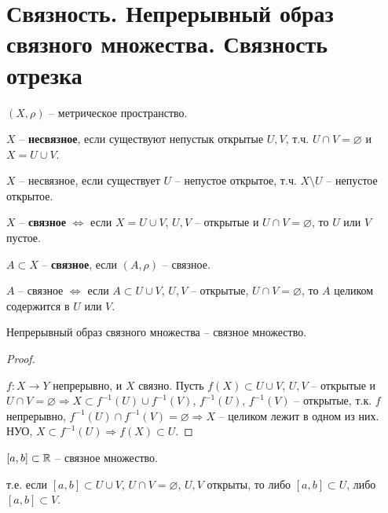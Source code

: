 
\section{Связность. Непрерывный образ связного множества. Связность отрезка}


\begin{conj}
    $(X, \rho)$ -- метрическое пространство.
    
    $X$ -- \textbf{несвязное}, если существуют непустык открытые $U, V$, 
    т.ч. $U \cap V = \varnothing$ и $X = U \cup V$.
\end{conj}

\notice $X$ -- несвязное, если существует $U$ -- непустое
открытое, т.ч. $X \setminus U$ -- непустое открытое.

\begin{conj}
    $X$ -- \textbf{связное} $\Longleftrightarrow$ если $X = U \cup V$, 
    $U, V$ -- открытые и $U \cap V = \varnothing$, то $U$ или $V$ пустое.
\end{conj}

\begin{conj}
    $A \subset X$ -- \textbf{связное}, если $(A, \rho)$ -- связное.
\end{conj}

\notice $A$ -- связное $\Longleftrightarrow$ если $A \subset U \cup V$,
$U, V$ -- открытые, $U \cap V = \varnothing$, то $A$ целиком содержится
в $U$ или $V$.

\begin{theorem-non}
    Непрерывный образ связного множества -- связное множество.
\end{theorem-non}
\begin{proof} $ $

    $f: X \rightarrow Y$ непрерывно, и $X$ связно. Пусть $f(X) \subset
    U \cup V$, $U, V$ -- открытые и $U \cap V = \varnothing \Rightarrow
    X \subset f^{-1}(U) \cup f^{-1}(V)$, $f^{-1}(U)$, $f^{-1}(V)$ --
    открытые, т.к. $f$ непрерывно, $f^{-1}(U) \cap f^{-1}(V) =
    \varnothing \Rightarrow X$ -- целиком лежит в одном из них.
    НУО, $X \subset f^{-1}(U) \Rightarrow f(X) \subset U$.
\end{proof}

\begin{theorem-non}
$[a, b] \subset \mathbb{R}$ -- связное множество.
\end{theorem-non}
т.е. если $[a, b] \subset U \cup V$, $U \cap V = \varnothing$, $U, V$
открыты, то либо $[a, b] \subset U$, либо $[a, b] \subset V$.

